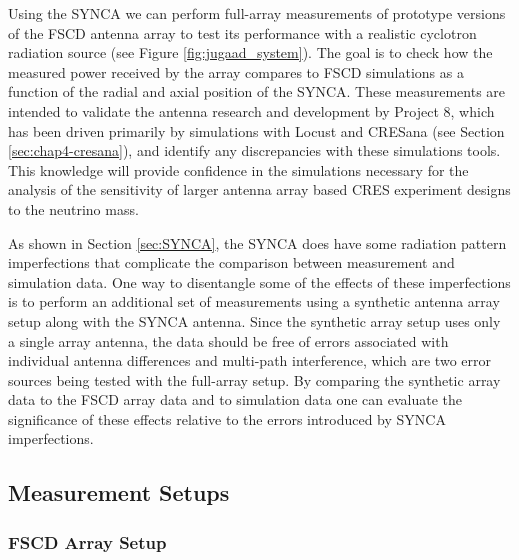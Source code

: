 Using the SYNCA we can perform full-array measurements of prototype versions of the FSCD antenna array to test its performance with a realistic cyclotron radiation source (see Figure \ref{fig:jugaad_system}). The goal is to check how the measured power received by the array compares to FSCD simulations as a function of the radial and axial position of the SYNCA. These measurements are intended to validate the antenna research and development by Project 8, which has been driven primarily by simulations with Locust \cite{p8locustpaper} and CRESana (see Section \ref{sec:chap4-cresana}), and identify any discrepancies with these simulations tools. This knowledge will provide confidence in the simulations necessary for the analysis of the sensitivity of larger antenna array based CRES experiment designs to the neutrino mass.

As shown in Section \ref{sec:SYNCA}, the SYNCA does have some radiation pattern imperfections that complicate the comparison between measurement and simulation data. One way to disentangle some of the effects of these imperfections is to perform an additional set of measurements using a synthetic antenna array setup along with the SYNCA antenna. Since the synthetic array setup uses only a single array antenna, the data should be free of errors associated with individual antenna differences and multi-path interference, which are two error sources being tested with the full-array setup. By comparing the synthetic array data to the FSCD array data and to simulation data one can evaluate the significance of these effects relative to the errors introduced by SYNCA imperfections.

\subsection{Measurement Setups}

\subsubsection{FSCD Array Setup}

